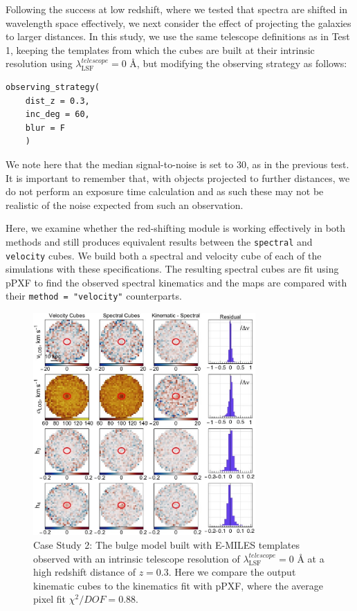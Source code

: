 \documentclass[
  journal=pasa,
  manuscript=research-paper, %
  year=2020,
  volume=37,
]{cup-journal}
\begin{document}
Following the success at low redshift, where we tested that spectra are shifted in wavelength space effectively, we next consider the effect of projecting the galaxies to larger distances. 
In this study, we use the same telescope definitions as in Test 1, keeping the templates from which the cubes are built at their intrinsic resolution using $\lambda_{\text{LSF}}^{telescope} = 0$ \AA, but modifying the observing strategy as follows:
\begin{lstlisting}[basicstyle=\fontsize{10}{8}\selectfont\ttfamily]
observing_strategy(
    dist_z = 0.3, 
    inc_deg = 60, 
    blur = F
    )
\end{lstlisting}

We note here that the median signal-to-noise is set to 30, as in the previous test. 
It is important to remember that, with objects projected to further distances, we do not perform an exposure time calculation and as such these may not be realistic of the noise expected from such an observation.

Here, we examine whether the red-shifting module is working effectively in both methods and still produces equivalent results between the \texttt{spectral} and \texttt{velocity} cubes.
We build both a spectral and velocity cube of each of the simulations with these specifications.
The resulting spectral cubes are fit using pPXF to find the observed spectral kinematics and the maps are compared with their \texttt{method = "velocity"} counterparts. 

\begin{figure}
    \centering
    \includegraphics[keepaspectratio, width=8.5cm]{cs2_bulge_velocities_highz_EMILES.jpeg}
    \caption{Case Study 2: The bulge model built with E-MILES templates observed with an intrinsic telescope resolution of  $\lambda_{\text{LSF}}^{telescope} = 0$ \AA{} at a high redshift distance of $z = 0.3$. Here we compare the output kinematic cubes to the kinematics fit with pPXF, where the average pixel fit $\chi^2/DOF = 0.88$.}
    \label{fig:cs2_bulge_E-MILES}
\end{figure}
\end{document}
